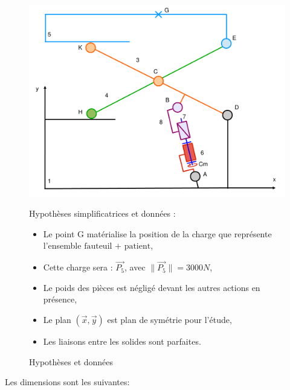 \begin{figure}[!h]
 \begin{minipage}{0.55\linewidth}
 \centering\includegraphics[width=\linewidth]{img/chaise_cin.pdf}
 \end{minipage}
 \hfill
 \begin{minipage}{0.48\linewidth}
\small Hypothèses simplificatrices et données : 
 \begin{itemize}
  \item Le point G matérialise la position de la charge que représente l'ensemble $\text{fauteuil + patient}$,
  \item Cette charge sera : $\overrightarrow{P_5}$, avec $\|\overrightarrow{P_5}\|=3000N$,
  \item Le poids des pièces est négligé devant les autres actions en présence,
  \item Le plan $(\overrightarrow{x},\overrightarrow{y})$ est plan de symétrie pour l'étude,
  \item Les liaisons entre les solides sont parfaites.
 \end{itemize}
 \end{minipage}
 \label{chaise_cin}
 \caption{Hypothèses et données}
\end{figure}

\normalsize

Les dimensions sont les suivantes:

